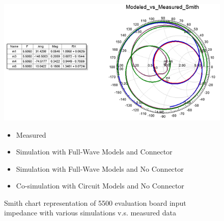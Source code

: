 \documentclass[12pt]{usfcoe}
\begin{document}
    \begin{figure}[H]
		\begin{center}
        	\includegraphics[width=\textwidth]{images/5500_simulation/s11.png} 
            \vspace{-\topsep}
            \begin{itemize}
                \centering
                \setlength{\parskip}{0pt}
                \setlength{\itemsep}{0pt} 
                \color{violet}
                \item Measured
                \color{green}
                \item Simulation with Full-Wave Models and Connector
                \color{blue}
                \item Simulation with Full-Wave Models and No Connector
                \color{red}
                \item Co-simulation with Circuit Models and No Connector
            \end{itemize}
        \vspace*{-9pt}

			\caption{Smith chart representation of 5500 evaluation board input impedance with various simulations v.s. measured data}  %
			\label{fig:5500_smith}
		\end{center}
    \end{figure}    
\end{document}
